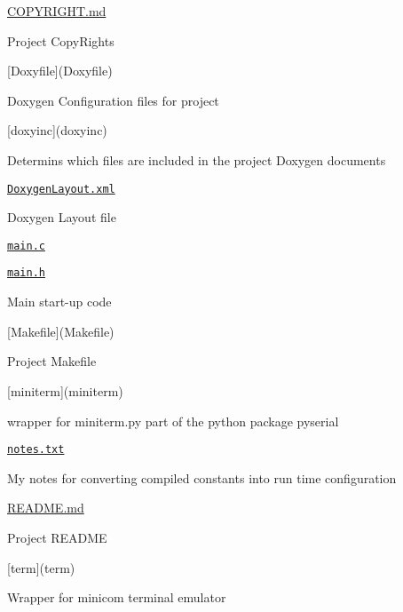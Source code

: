 \begin{DoxyItemize}
\item \hyperlink{COPYRIGHT_8md}{C\+O\+P\+Y\+R\+I\+G\+HT.md}
\begin{DoxyItemize}
\item Project Copy\+Rights
\end{DoxyItemize}
\item \mbox{[}Doxyfile\mbox{]}(Doxyfile)
\begin{DoxyItemize}
\item Doxygen Configuration files for project
\end{DoxyItemize}
\item \mbox{[}doxyinc\mbox{]}(doxyinc)
\begin{DoxyItemize}
\item Determins which files are included in the project Doxygen documents
\end{DoxyItemize}
\item \href{DoxygenLayout.xml}{\tt Doxygen\+Layout.\+xml}
\begin{DoxyItemize}
\item Doxygen Layout file
\end{DoxyItemize}
\item \href{main.c}{\tt main.\+c}
\item \href{main.h}{\tt main.\+h}
\begin{DoxyItemize}
\item Main start-\/up code
\end{DoxyItemize}
\item \mbox{[}Makefile\mbox{]}(Makefile)
\begin{DoxyItemize}
\item Project Makefile
\end{DoxyItemize}
\item \mbox{[}miniterm\mbox{]}(miniterm)
\begin{DoxyItemize}
\item wrapper for miniterm.\+py part of the python package pyserial
\end{DoxyItemize}
\item \href{notes.txt}{\tt notes.\+txt}
\begin{DoxyItemize}
\item My notes for converting compiled constants into run time configuration
\end{DoxyItemize}
\item \hyperlink{md_README}{R\+E\+A\+D\+ME.md}
\begin{DoxyItemize}
\item Project R\+E\+A\+D\+ME
\end{DoxyItemize}
\item \mbox{[}term\mbox{]}(term)
\begin{DoxyItemize}
\item Wrapper for minicom terminal emulator
\end{DoxyItemize}
\end{DoxyItemize}

